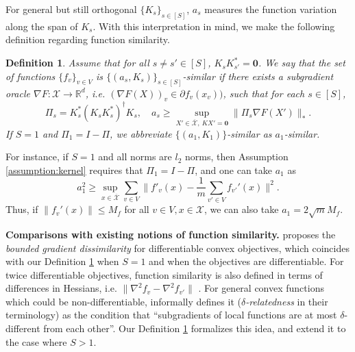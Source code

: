 \documentclass[10pt]{article}
\newcommand{\mc}{\mathcal}
\newcommand{\mb}{\mathbf}
\newcommand{\R}{\mathbb{R}}
\newtheorem{definition}{Definition}[section]
\begin{document}
For general but still orthogonal $\{K_s\}_{s\in [S]}$, $a_s$ measures the function variation along the span of $K_s$. With this interpretation in mind, we make the following definition regarding function similarity.
\begin{definition}\label{def:func_simi}
Assume that for all $s\neq s'\in [S]$, $K_sK_{s'}^* = \mb 0$. We say that the set of functions $\{f_v\}_{v\in V}$ is $\{(a_s,K_s)\}_{s\in [S]} $-similar if there exists a subgradient oracle $\nabla F:{\mc X}\to \R^{d}$, i.e. $(\nabla F(X))_v\in \partial f_v(x_v))$, such that for each $s\in [S]$, 
    \begin{displaymath}
        \Pi_s = K_s^*(K_sK_s^*)^{\dagger}K_s,\quad a_s \geq \sup_{X'\in \overline{\mc X},~KX' = \mb 0} \|\Pi_s\nabla F(X')\|_*.
    \end{displaymath}
If $S=1$ and $\Pi_1 = I-\Pi$, we abbreviate $\{(a_1,K_1)\}$-similar as $a_1$-similar. 
\end{definition}
For instance, if $S = 1$ and all norms are $l_2$ norms, then Assumption \ref{assumption:kernel} requires that $\Pi_1 = I-\Pi$, and one can take $a_1$ as 
\begin{displaymath}
    a_1^2 \geq \sup_{x\in \overline{\mc X}} \sum_{v\in V}\|f'_v(x) - \frac{1}{m}\sum_{v'\in V} f_{v'}'(x)\|^2.
    \end{displaymath}
Thus, if $\|f_v'(x)\|\leq M_f$ for all $v\in V,x\in \mc X$, we can also take $a_1= 2\sqrt{m}M_f$. 




\textbf{Comparisons with existing notions of function similarity.} \cite{pmlr-v119-karimireddy20a} proposes the \textit{bounded gradient dissimilarity} for differentiable convex objectives, which coincides with our Definition \ref{def:func_simi} when $S=1$ and when the objectives are differentiable. For twice differentiable objectives, function similarity is also defined in terms of differences in Hessians, i.e. $\|\nabla^2 f_v -\nabla^2 f_{v'}\|$ \cite{pmlr-v151-tian22b,konecny2016federatedoptimizationdistributedmachine,ArjevaniShamir2015Communication,pmlr-v119-karimireddy20a}. For general convex functions which could be non-differentiable, \cite{ArjevaniShamir2015Communication} informally defines it (\textit{$\delta$-relatedness} in their terminology) as the condition that ``subgradients of local functions are at most $\delta$-different from each other''. Our Definition \ref{def:func_simi} formalizes this idea, and extend it to the case where $S>1$. 
\end{document}
